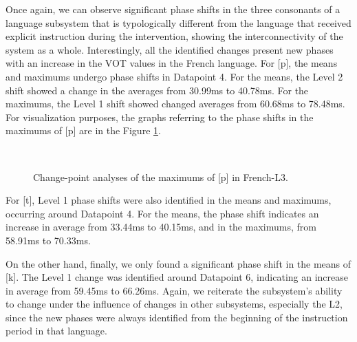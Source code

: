 Once again, we can observe significant phase shifts in the three consonants of
a language subsystem that is typologically different from the language that
received explicit instruction during the intervention, showing the
interconnectivity of the system as a whole. Interestingly, all the identified
changes present new phases with an increase in the VOT values in the French
language. For [p], the means and maximums undergo phase shifts in Datapoint 4.
For the means, the Level 2 shift showed a change in the averages from 30.99ms
to 40.78ms. For the maximums, the Level 1 shift  showed changed averages from
60.68ms to 78.48ms. For visualization purposes, the graphs referring to the
phase shifts in the maximums of [p] are in the Figure \ref{laura-fig06}.

\begin{figure}[h]
\centering
{} \qquad
{} \\
\caption{Change-point analyses of the maximums of [p] in French-L3.}
\label{laura-fig06}
\end{figure}

For [t], Level 1 phase shifts were also identified in the means and maximums,
occurring around Datapoint 4. For the means, the phase shift indicates an
increase in average from 33.44ms to 40.15ms, and in the maximums, from 58.91ms
to 70.33ms.

On the other hand, finally, we only found a significant phase shift in the
means of [k]. The Level 1 change was identified around Datapoint 6, indicating
an increase in average from 59.45ms to 66.26ms. Again, we reiterate the
subsystem's ability to change under the influence of changes in other
subsystems, especially the L2, since the new phases were always identified from
the beginning of the instruction period in that language.


